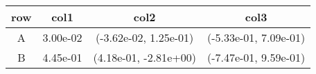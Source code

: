 \begin{tabular}{cccc}
\toprule
row&col1&col2&col3\tabularnewline
\midrule
A&3.00e-02& (-3.62e-02, 1.25e-01)& (-5.33e-01, 7.09e-01)\tabularnewline
B&4.45e-01& (4.18e-01, -2.81e+00)& (-7.47e-01, 9.59e-01)\tabularnewline
\bottomrule
\end{tabular}
